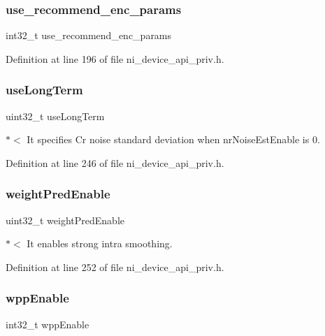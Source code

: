 \subsubsection{\texorpdfstring{use\_recommend\_enc\_params}{use\_recommend\_enc\_params}}
{\footnotesize\ttfamily int32\+\_\+t use\+\_\+recommend\+\_\+enc\+\_\+params}



Definition at line 196 of file ni\+\_\+device\+\_\+api\+\_\+priv.\+h.

\mbox{\label{struct__ni__t408__config__t_a9260fe23ed9a23a899dc0e57553c8fd0}} 
\subsubsection{\texorpdfstring{useLongTerm}{useLongTerm}}
{\footnotesize\ttfamily uint32\+\_\+t use\+Long\+Term}

$\ast$$<$ It specifies Cr noise standard deviation when nr\+Noise\+Est\+Enable is 0. 

Definition at line 246 of file ni\+\_\+device\+\_\+api\+\_\+priv.\+h.

\mbox{\label{struct__ni__t408__config__t_ab0c6d0beb8986315794f90533523f59d}} 
\subsubsection{\texorpdfstring{weightPredEnable}{weightPredEnable}}
{\footnotesize\ttfamily uint32\+\_\+t weight\+Pred\+Enable}

$\ast$$<$ It enables strong intra smoothing. 

Definition at line 252 of file ni\+\_\+device\+\_\+api\+\_\+priv.\+h.

\mbox{\label{struct__ni__t408__config__t_a869f52b6d5d81b354874776365772d9a}} 
\subsubsection{\texorpdfstring{wppEnable}{wppEnable}}
{\footnotesize\ttfamily int32\+\_\+t wpp\+Enable}

